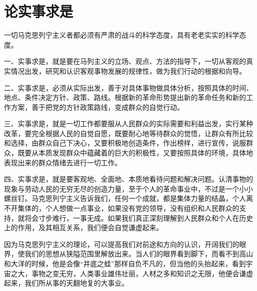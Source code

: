 \section[论实事求是 ]{论实事求是 }


一切马克思列宁主义者都必须有严肃的战斗的科学态度，具有老老实实的科学态度。

一、实事求是，就是要在马列主义的立场、观点、方法的指导下，一切从客观的真实情况出发，研究和认识客观事物发展的规律性，做为我们行动的根据和向导。

二、实事求是，必须从实际出发，善于对具体事物做具体分析，按照具体的时间、地点、条件决定方针、政策、路线。根据新的革命形势提出新的革命任务和新的工作方案，善于把党的方针政策路线，变成群众的自觉行动。

三、实事求是，就是一切工作都要服从人民群众的实际需要和利益出发，实行某种改革，要完全根据人民的自觉自愿，既要耐心地等待群众的觉悟，让群众有所比较和选择，由群众自己下决心，又要积极地创造条件，作出榜样，进行宣传，说服群众，既要从本质发现群众中蕴藏着的巨大的积极性，又要按照具体的环境，具体地表现出来的群众情绪去进行一切工作。

四、实事求是，就是要客观地、全面地、本质地看待问题和解决问题。认清事物的现象与劳动人民的无穷无尽的创造力量，至于个人的革命事业中，不过是一个小小螺丝钉。马克思列宁主义告诉我们，任何一个成就，都是集体力量的结晶，个人离不开集体的，个人想做一点事业，如果没有党的领导，没有组织和人民群众的支持，就将会寸步难行，一事无成。如果我们真正深刻理解到人民群众和个人在历史上的作用，及其相互关系，我们便会自觉谦虚起来。

因为马克思列宁主义的理论，可以提高我们对前途和方向的认识，开阔我们的眼界，使我们的思想从狭隘范围里解放出来。当人们的眼界看到脚下，而看不到高山和大洋的时候，他是会像“井底之蛙”那样自负不凡的，但当他的头抬起来，看到宇宙之大，事物之变无穷，人类事业雄伟壮丽，人材之多和知识之无限，他便会谦虚起来，我们所从事的天翻地复的大事业。

